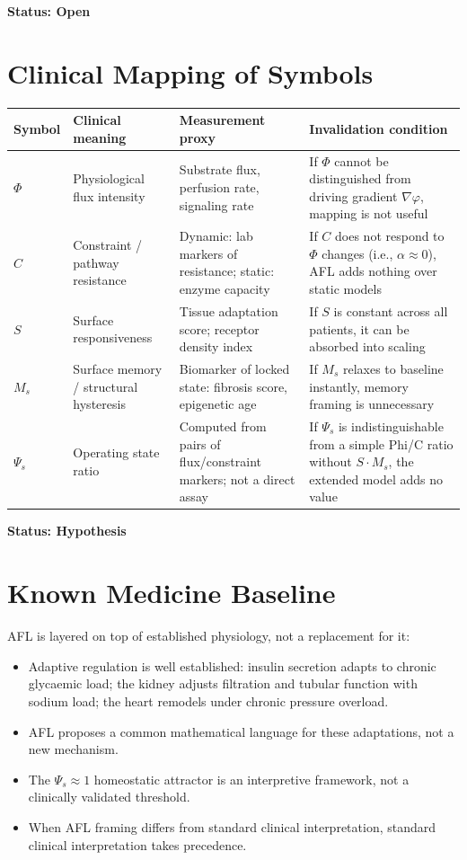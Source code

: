 \documentclass[11pt]{article}
\begin{document}
\textbf{Status: Open}

\section{Clinical Mapping of Symbols}

\begin{center}
\begin{tabular}{p{1.5cm}p{3.2cm}p{3.8cm}p{4.5cm}}
\toprule
Symbol & Clinical meaning & Measurement proxy & Invalidation condition \\
\midrule
$\Phi$ & Physiological flux intensity & Substrate flux, perfusion rate, signaling rate & If $\Phi$ cannot be distinguished from driving gradient $\nabla\varphi$, mapping is not useful \\
$C$ & Constraint / pathway resistance & Dynamic: lab markers of resistance; static: enzyme capacity & If $C$ does not respond to $\Phi$ changes (i.e., $\alpha \approx 0$), AFL adds nothing over static models \\
$S$ & Surface responsiveness & Tissue adaptation score; receptor density index & If $S$ is constant across all patients, it can be absorbed into scaling \\
$M_s$ & Surface memory / structural hysteresis & Biomarker of locked state: fibrosis score, epigenetic age & If $M_s$ relaxes to baseline instantly, memory framing is unnecessary \\
$\Psi_s$ & Operating state ratio & Computed from pairs of flux/constraint markers; not a direct assay & If $\Psi_s$ is indistinguishable from a simple Phi/C ratio without $S \cdot M_s$, the extended model adds no value \\
\bottomrule
\end{tabular}
\end{center}

\textbf{Status: Hypothesis}

\section{Known Medicine Baseline}

AFL is layered on top of established physiology, not a replacement for it:
\begin{itemize}
    \item Adaptive regulation is well established: insulin secretion adapts to chronic glycaemic load; the kidney adjusts filtration and tubular function with sodium load; the heart remodels under chronic pressure overload.
    \item AFL proposes a common mathematical language for these adaptations, not a new mechanism.
    \item The $\Psi_s \approx 1$ homeostatic attractor is an interpretive framework, not a clinically validated threshold.
    \item When AFL framing differs from standard clinical interpretation, standard clinical interpretation takes precedence.
\end{itemize}
\end{document}
